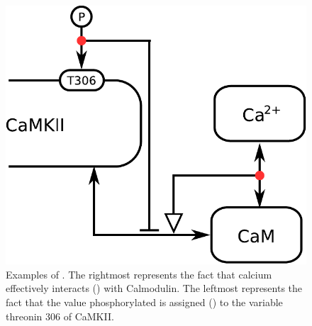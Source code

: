 \begin{figure}[H]
  \centering
  \includegraphics[scale = 0.5]{examples/ex-outcome}
  \caption{Examples of . The rightmost represents the fact that calcium effectively interacts () with Calmodulin. The leftmost represents the fact that the value phosphorylated is assigned () to the variable threonin 306 of CaMKII.}
  \label{fig:ex-outcome}
\end{figure}

\normalcolor
	
